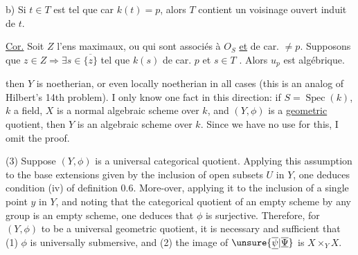 b) Si $t\in T$ est tel que car $k(t)=p$, alors $T$ contient un voisinage ouvert induit de $t$. 


\uline{Cor.} Soit $Z$ l'ens   maximaux, ou qui sont associés  à $O_S$ \uline{et} de car. $\ne p$. Supposons que $z\in Z\Longrightarrow\exists s\in\overline{\{z\}}$ tel que $k(s)$ de car. $p$ et $s\in T$ . Alors $u_p$ est algébrique.


then $Y$ is noetherian, or even locally noetherian in all cases (this is an analog of Hilbert's 14th problem). I only know one fact in this direction: if $S=\operatorname{Spec}(k)$, $k$ a field, $X$ is a normal algebraic scheme over $k$, and $(Y,\phi)$ is a \uline{geometric} quotient, then $Y$ is an algebraic scheme over $k$. Since we have no use for this, I omit the proof.

(3) Suppose $(Y,\phi)$ is a universal categorical quotient. Applying this assumption to the base extensions given by the inclusion of open subsets $U$ in $Y$, one deduces condition (iv) of definition 0.6. More-over, applying it to the inclusion of a single point $y$ in $Y$, and noting that the categorical quotient of an empty scheme by any group is an empty scheme, one deduces that $\phi$ is surjective. Therefore, for $(Y,\phi)$ to be a universal geometric quotient, it is necessary and sufficient that (1) $\phi$ is universally submersive, and (2) the image of $\unsure{\overline{\underline{\psi}}|\overline{\underline{\Psi}}}$ is $X\times_Y X$.

